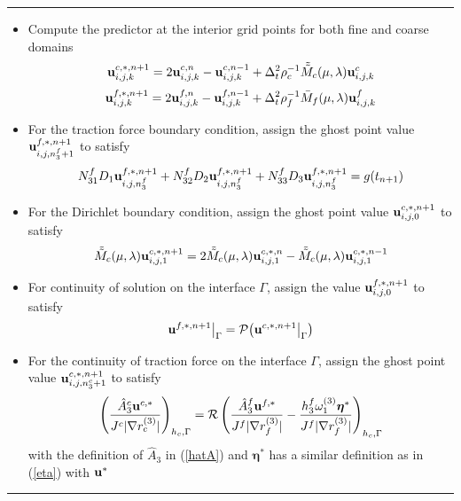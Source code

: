 \documentclass[a4paper]{article}
\makeatletter
\newenvironment{breakablealgorithm}
{%
	\begin{center}
		\refstepcounter{algorithm}%
		\hrule height.8pt depth0pt \kern2pt%
		\renewcommand{\caption}[2][\relax]{%
			{\raggedright\textbf{\ALG@name~\thealgorithm} ##2\par}%
			\ifx\relax##1\relax %
			\addcontentsline{loa}{algorithm}{\protect\numberline{\thealgorithm}##2}%
			\else %
			\addcontentsline{loa}{algorithm}{\protect\numberline{\thealgorithm}##1}%
			\fi
			\kern2pt\hrule\kern2pt
		}
	}{%
		\kern2pt\hrule\relax%
	\end{center}
}
\makeatother
\begin{document}
\begin{breakablealgorithm}
	\begin{itemize}
	\item  {Compute the predictor at the interior grid points for both fine and coarse domains
		\begin{equation*}
		   {\bf u}^{c,*,n+1}_{i,j,k} = 2{\bf u}^{c,n}_{i,j,k} - {\bf u}^{c,n-1}_{i,j,k} + \Delta_t^2\rho_c^{-1}\tilde{\tilde{M}}_c(\mu,\lambda) {\bf{u}}^c_{i,j,k}
		\end{equation*}
		\begin{equation*}
		{\bf u}^{f,*,n+1}_{i,j,k} = 2{\bf u}^{f,n}_{i,j,k} - {\bf u}^{f,n-1}_{i,j,k} + \Delta_t^2\rho_f^{-1}{\bar{M}}_f(\mu,\lambda) {\bf{u}}^f_{i,j,k}
		\end{equation*}
	   }
   \item {For the traction force boundary condition, assign the ghost point value ${\bf u}^{f,*,n+1}_{i,j,n^f_3+1}$ to satisfy
   	\begin{equation*}
   	N_{31}^fD_1{\bf u}^{f,*,n+1}_{i,j,n^f_3} + N_{32}^fD_2{\bf u}^{f,*,n+1}_{i,j,n^f_3} + N_{33}^fD_3{\bf u}^{f,*,n+1}_{i,j,n^f_3} = g(t_{n+1})
   	\end{equation*}
   }
   \item {For the Dirichlet boundary condition, assign the ghost point value ${\bf u}^{c,*,n+1}_{i,j,0}$ to satisfy
   	\begin{equation*}
   	\tilde{\tilde{M}}_c(\mu,\lambda) {\bf{u}}^{c,*,n+1}_{i,j,1} = 2\tilde{\tilde{M}}_c(\mu,\lambda) {\bf{u}}^{c,*,n}_{i,j,1} - 	\tilde{\tilde{M}}_c(\mu,\lambda) {\bf{u}}^{c,*,n-1}_{i,j,1}
   	\end{equation*}
   }
  \item{For continuity of solution on the interface $\Gamma$, assign the value ${\bf u}^{f,*,n+1}_{i,j,0}$ to satisfy
  	\begin{equation*}
  	{\bf u}^{f,*,n+1}\big|_{\Gamma} = \mathcal{P}\big({\bf u}^{c,*,n+1}\big|_{\Gamma}\big)
  	\end{equation*}
  }
  \item{For the continuity of traction force on the interface $\Gamma$, assign the ghost point value ${\bf u}^{c,*,n+1}_{i,j,n_3^c+1}$ to satisfy
  	\begin{equation}\label{traction_gamma_pre}
  	\left(\frac{\hat{A}_3^c{\bf u}^{c,*}}{J^c|\nabla r_c^{(3)}|}\right)_{h_c,\Gamma} = \mathcal{R}\left(\frac{\hat{A}_3^f{\bf u}^{f,*}}{J^f|\nabla r_f^{(3)}|} - \frac{h_3^f\omega_1^{(3)}{\bm \eta}^*}{J^f|\nabla r_f^{(3)}|}\right)_{h_c,\Gamma}
  	\end{equation}
  	with the definition of $\hat{A}_3$ in (\ref{hatA}) and ${\bm \eta}^*$ has a similar definition as in (\ref{eta}) with ${\bf u}^{*}$
}
\end{itemize}
\end{breakablealgorithm}
\end{document}
